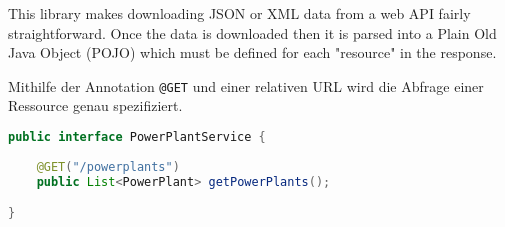 

This library makes downloading JSON or XML data from a web API fairly straightforward. Once the data is downloaded then it is parsed into a Plain Old Java Object (POJO) which must be defined for each "resource" in the response.



Mithilfe der Annotation \texttt{@GET} und einer relativen URL wird die Abfrage einer Ressource genau spezifiziert.

\begin{lstlisting}[language=java, caption={GET Abfrage},label=getRetrofit]
public interface PowerPlantService {
	
	@GET("/powerplants")
	public List<PowerPlant> getPowerPlants();

}
\end{lstlisting}
